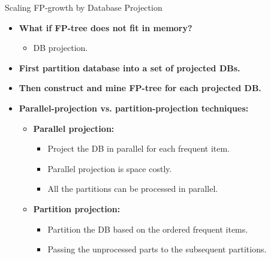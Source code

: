 \begin{frame}{Scaling FP-growth by Database Projection}
	\centering
	\begin{itemize}
		\item \textbf{What if FP-tree does not fit in memory?}
		      \begin{itemize}
			      \item DB projection.
		      \end{itemize}
		\item \textbf{First partition database into a set of projected DBs.}
		\item \textbf{Then construct and mine FP-tree for each projected DB.}
		\item \textbf{Parallel-projection vs. partition-projection techniques:}
		      \begin{itemize}
			      \item \textbf{\color{airforceblue}Parallel projection:}
			            \begin{itemize}
				            \item Project the DB in parallel for each frequent item.
				            \item Parallel projection is space costly.
				            \item All the partitions can be processed in parallel.
			            \end{itemize}
			      \item \textbf{\color{airforceblue}Partition projection:}
			            \begin{itemize}
				            \item Partition the DB based on the ordered frequent items.
				            \item Passing the unprocessed parts to the subsequent
				                  partitions.
			            \end{itemize}
		      \end{itemize}
	\end{itemize}
\end{frame}

